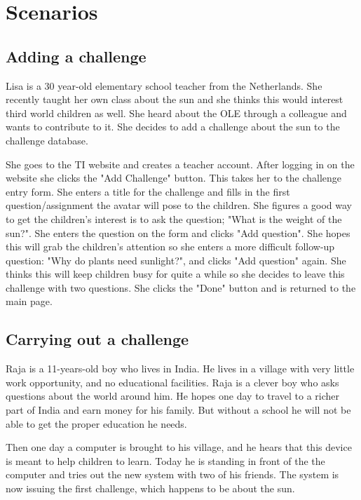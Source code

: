 \documentclass[a4paper]{article}
\begin{document}
\section{Scenarios}

\subsection{Adding a challenge}

Lisa is a 30 year-old elementary school teacher from the Netherlands. She recently taught her own class about the sun and she thinks this would interest third world children as well. She heard about the OLE through a colleague and wants to contribute to it. She decides to add a challenge about the sun to the challenge database. 

She goes to the TI website and creates a teacher account. After logging in on the website she clicks the "Add Challenge" button. This takes her to the challenge entry form. She enters a title for the challenge and fills in the first question/assignment the avatar will pose to the children. She figures a good way to get the children's interest is to ask the question; "What is the weight of the sun?". She enters the question on the form and clicks "Add question". She hopes this will grab the children's attention so she enters a more difficult follow-up question: "Why do plants need sunlight?", and clicks "Add question" again. She thinks this will keep children busy for quite a while so she decides to leave this challenge with two questions. She clicks the "Done" button and is returned to the main page. 

\subsection{Carrying out a challenge}

Raja is a 11-years-old boy who lives in India. He lives in a village with very little work opportunity, and no educational facilities. Raja is a clever boy who asks questions about the world around him. He hopes one day to travel to a richer part of India and earn money for his family. But without a school he will not be able to get the proper education he needs.

Then one day a computer is brought to his village, and he hears that this device is meant to help children to learn. Today he is standing in front of the the computer and tries out the new system with two of his friends. The system is now issuing the first challenge, which happens to be about the sun.
\end{document}
